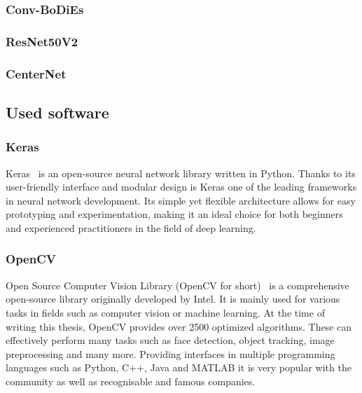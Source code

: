 \subsubsection{Conv-BoDiEs}
\subsubsection{ResNet50V2}
\subsubsection{CenterNet}

\subsection{Used software}
\subsubsection{Keras}
Keras~\cite{keras} is an open-source neural network library written in Python. Thanks to its user-friendly interface and modular design is Keras one of the leading frameworks in neural network development. Its simple yet flexible architecture allows for easy prototyping and experimentation, making it an ideal choice for both beginners and experienced practitioners in the field of deep learning.
\subsubsection{OpenCV }
Open Source Computer Vision Library (OpenCV for short)~\cite{opencv} is a comprehensive open-source library originally developed by Intel. It is mainly used for various tasks in fields such as computer vision or machine learning. At the time of writing this thesis, OpenCV provides over 2500 optimized algorithms. These can effectively perform many tasks such as face detection, object tracking, image preprocessing and many more. Providing interfaces in multiple programming languages such as Python, C++, Java and MATLAB it is very popular with the community as well as recognisable and famous companies.